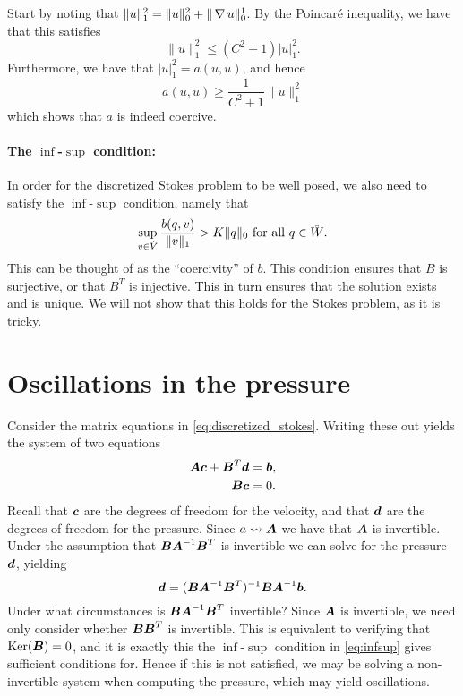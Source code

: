 Start by noting that \(\| u \|_1^2 = \| u \|_0^2 + \| \operatorname{\mathop{}\!\nabla} u \|_0^1 \). By the
Poincar\'e inequality, we have that this satisfies
\begin{equation}
    \| u \|_1^2 \leq (C^2 + 1 )|u|_1^2.
\end{equation}
Furthermore, we have that \( |u|_1^2 = a(u, u) \), and hence
\begin{equation}
    a(u, u) \geq \frac{1}{C^2 + 1}\|u\|_1^2
\end{equation}
which shows that \( a \) is indeed coercive.

\paragraph{The \(\inf\)-\(\sup\) condition:}

In order for the discretized Stokes problem to be well posed, we also need to
satisfy the \( \inf \)-\(\sup\) condition, namely that
\begin{equation}
    \label{eq:infsup}
    \sup_{v \in \hat{V}} \frac{b(q, v)}{\|v\|_1} > K \| q \|_0 \text{ for all } q \in \hat{W}.
\end{equation}
This can be thought of as the ``coercivity'' of \( b \). This condition ensures
that \( B \) is surjective, or that \( B^T \) is injective. This in turn
ensures that the solution exists and is unique. We will not show that this
holds for the Stokes problem, as it is tricky.

\section{Oscillations in the pressure}

Consider the matrix equations in \vref{eq:discretized_stokes}. Writing these
out yields the system of two equations
\begin{align}
    \boldsymbol{A} \boldsymbol{c} + \boldsymbol{B}^T \boldsymbol{d} &= \boldsymbol{b}, \\
    \boldsymbol{B}\boldsymbol{c} &= 0.
\end{align}
Recall that \( \boldsymbol{c} \) are the degrees of freedom for the velocity, and that \(
\boldsymbol{d} \) are the degrees of freedom for the pressure. Since \( a \rightsquigarrow
\boldsymbol{A} \) we have that \( \boldsymbol{A} \) is invertible. Under the assumption that \(\boldsymbol{B}
\boldsymbol{A}^{-1} \boldsymbol{B}^T\) is invertible we can solve for the pressure \( \boldsymbol{d} \), yielding
\begin{equation}
    \boldsymbol{d} = (\boldsymbol{B}\boldsymbol{A}^{-1}\boldsymbol{B}^T)^{-1} \boldsymbol{B}\boldsymbol{A}^{-1}\boldsymbol{b}.
\end{equation}
Under what circumstances is \( \boldsymbol{B}\boldsymbol{A}^{-1}\boldsymbol{B}^T \) invertible? Since \( \boldsymbol{A} \) is
invertible, we need only consider whether \( \boldsymbol{B}\boldsymbol{B}^T \) is invertible. This is
equivalent to verifying that \( \operatorname{Ker}(\boldsymbol{B}) = 0 \), and it is exactly this the \(
\inf\)-\(\sup\) condition in \vref{eq:infsup} gives sufficient conditions for.
Hence if this is not satisfied, we may be solving a non-invertible system when
computing the pressure, which may yield oscillations.

